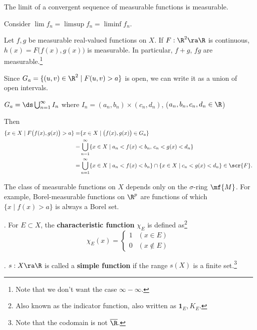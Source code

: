 \cor The limit of a convergent sequence of measurable functions is measurable.

\pf Consider \(\lim f_n = \limsup f_n = \liminf f_n\).

\pagebreak

 Let \(f, g\) be measurable real-valued functions on \(X\). If \(F: \R^2 \ra \R\) is continuous, \(h(x) = F\big(f(x), g(x)\big)\) is measurable. In particular, \(f + g\), \(fg\) are measurable.\footnote{Note that we don't want the case \(\infty - \infty\).}

\pf Since \(G_a = \{(u, v)\in \R^2 \mid F(u, v) > a\}\) is open, we can write it as a union of open intervals.
\begin{center}
    \(G_a = \ds \bigcup_{n=1}^{\infty} I_n\) where \(I_n = (a_n, b_n) \times (c_n, d_n)\), \quad (\(a_n, b_n, c_n, d_n\in \R\))
\end{center}
Then
\[
    \begin{aligned}
        \{x \in X \mid F\bigl(f(x), g(x)\bigr) > a\} = & \{x \in X \mid \bigl(f(x), g(x)\bigr) \in G_a\}                                                              \\
        =                                              & \bigcup_{n=1}^{\infty} \{x \in X \mid a_n < f(x) < b_n,\, c_n < g(x) < d_n\}                                 \\
        =                                              & \bigcup_{n=1}^{\infty} \{x \in X \mid a_n < f(x) < b_n\} \cap \{x \in X \mid c_n < g(x) < d_n\} \in \scr{F}.
    \end{aligned}
\]

The class of measurable functions on \(X\) depends only on the \(\sigma\)-ring \(\mf{M}\). For example, Borel-measurable functions on \(\R^p\) are functions of which \(\{x \mid f(x) > a\}\) is always a Borel set.

.  For \(E \subset X\), the \textbf{characteristic function} \(\chi_E\) is defined as\footnote{Also known as the indicator function, also written as \(\mathbf{1}_E, K_E\).}\\
\[
    \chi_E(x) = \begin{cases}
        1 & (x\in E) \\ 0 & (x \notin E)
    \end{cases}
\]

.  \(s: X\ra\R\) is called a \textbf{simple function} if the range \(s(X)\) is a finite set.\footnote{Note that the codomain is not \(\overline{\R}\).}

